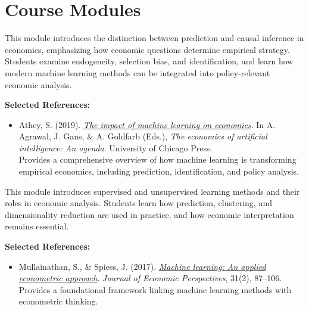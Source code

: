\documentclass[11pt]{article}
\newcommand{\coloredsection}[1]{%
    \section*{\large\textcolor{sectioncolor}{#1}}%
}
\begin{document}
\coloredsection{Course Modules}

\begin{description}[leftmargin=0cm, labelindent=0cm, itemsep=1em]


\item[\textbf{Module 1: Economic Questions, Prediction, and Causality}]
This module introduces the distinction between prediction and causal inference in economics, emphasizing how economic questions determine empirical strategy. Students examine endogeneity, selection bias, and identification, and learn how modern machine learning methods can be integrated into policy-relevant economic analysis.

\vspace{0.3em}
\textbf{Selected References:}
\begin{itemize}[leftmargin=1.5em]
\item Athey, S. (2019).
\href{https://www.nber.org/chapters/c14009}{\textit{The impact of machine learning on economics}}.
In A. Agrawal, J. Gans, \& A. Goldfarb (Eds.), \textit{The economics of artificial intelligence: An agenda}. University of Chicago Press. \\
Provides a comprehensive overview of how machine learning is transforming empirical economics, including prediction, identification, and policy analysis.
\end{itemize}


\item[\textbf{Module 2: Supervised and Unsupervised Learning in Economics}]
This module introduces supervised and unsupervised learning methods and their roles in economic analysis. Students learn how prediction, clustering, and dimensionality reduction are used in practice, and how economic interpretation remains essential.

\vspace{0.3em}
\textbf{Selected References:}
\begin{itemize}[leftmargin=1.5em]
\item Mullainathan, S., \& Spiess, J. (2017).
\href{https://doi.org/10.1257/jep.31.2.87}{\textit{Machine learning: An applied econometric approach}}.
\textit{Journal of Economic Perspectives}, 31(2), 87--106. \\
Provides a foundational framework linking machine learning methods with econometric thinking.


\end{itemize}
\end{description}
\end{document}

